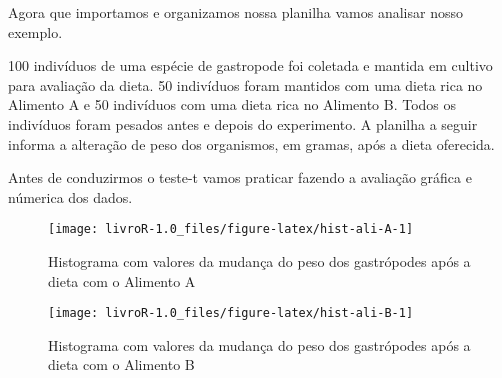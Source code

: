 \documentclass[14pt,titlepage, oneside, openany, a4paper]{book}
\newenvironment{Shaded}{\begin{snugshade}}{\end{snugshade}}
\newcommand{\DataTypeTok}[1]{\textcolor[rgb]{0.13,0.29,0.53}{#1}}
\newcommand{\KeywordTok}[1]{\textcolor[rgb]{0.13,0.29,0.53}{\textbf{#1}}}
\newcommand{\NormalTok}[1]{#1}
\newcommand{\OperatorTok}[1]{\textcolor[rgb]{0.81,0.36,0.00}{\textbf{#1}}}
\newcommand{\StringTok}[1]{\textcolor[rgb]{0.31,0.60,0.02}{#1}}
\begin{document}
Agora que importamos e organizamos nossa planilha vamos analisar nosso exemplo.

100 indivíduos de uma espécie de gastropode foi coletada e mantida em cultivo para avaliação da dieta. 50 indivíduos foram mantidos com uma dieta rica no Alimento A e 50 indivíduos com uma dieta rica no Alimento B. Todos os indivíduos foram pesados antes e depois do experimento. A planilha a seguir informa a alteração de peso dos organismos, em gramas, após a dieta oferecida.

Antes de conduzirmos o teste-t vamos praticar fazendo a avaliação gráfica e númerica dos dados.

\begin{Shaded}
\end{Shaded}

\begin{figure}[H]
\texttt{[image: livroR-1.0\_files/figure-latex/hist-ali-A-1]} \caption{Histograma com valores da mudança do peso dos gastrópodes após a dieta com o Alimento A}\label{fig:hist-ali-A}
\end{figure}

\begin{Shaded}
\end{Shaded}

\begin{figure}[H]
\texttt{[image: livroR-1.0\_files/figure-latex/hist-ali-B-1]} \caption{Histograma com valores da mudança do peso dos gastrópodes após a dieta com o Alimento B}\label{fig:hist-ali-B}
\end{figure}
\end{document}

